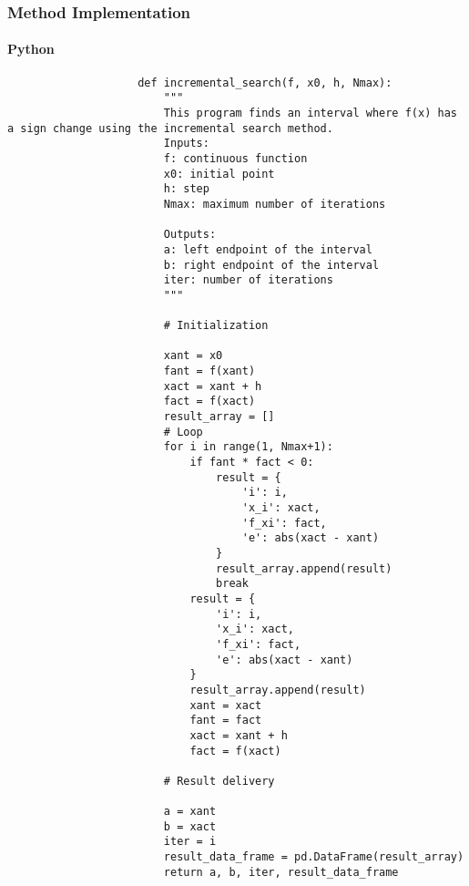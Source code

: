 \documentclass{article}
\begin{document}
            \subsubsection{Method Implementation}

                \paragraph{Python}

                \begin{verbatim}
                    def incremental_search(f, x0, h, Nmax):
                        """
                        This program finds an interval where f(x) has a sign change using the incremental search method.
                        Inputs:
                        f: continuous function
                        x0: initial point
                        h: step
                        Nmax: maximum number of iterations
            
                        Outputs:
                        a: left endpoint of the interval
                        b: right endpoint of the interval
                        iter: number of iterations
                        """
            
                        # Initialization
            
                        xant = x0
                        fant = f(xant)
                        xact = xant + h
                        fact = f(xact)
                        result_array = []
                        # Loop
                        for i in range(1, Nmax+1):
                            if fant * fact < 0:
                                result = {
                                    'i': i,
                                    'x_i': xact,
                                    'f_xi': fact,
                                    'e': abs(xact - xant)
                                }
                                result_array.append(result)
                                break
                            result = {
                                'i': i,
                                'x_i': xact,
                                'f_xi': fact,
                                'e': abs(xact - xant)
                            }
                            result_array.append(result)
                            xant = xact
                            fant = fact
                            xact = xant + h
                            fact = f(xact)
            
                        # Result delivery
            
                        a = xant
                        b = xact
                        iter = i
                        result_data_frame = pd.DataFrame(result_array)
                        return a, b, iter, result_data_frame
                    \end{verbatim}
\end{document}
